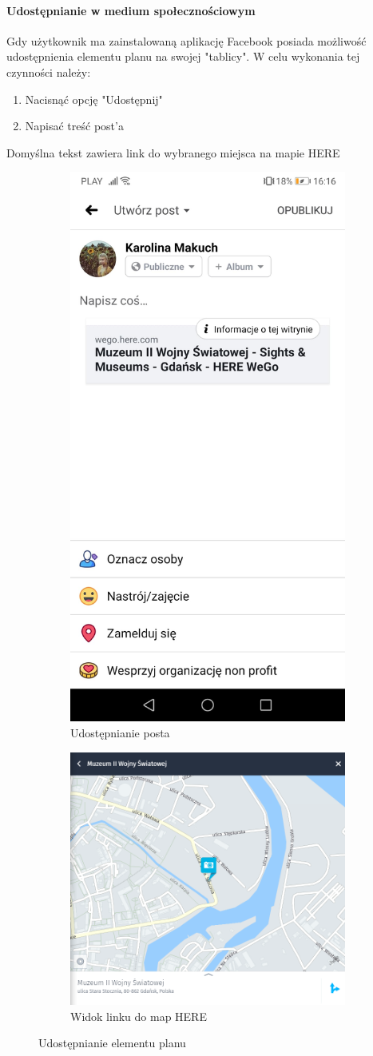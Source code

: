 \documentclass[10pt,twoside,a4paper]{report}
\begin{document}
\paragraph{Udostępnianie w medium społecznościowym}
Gdy użytkownik ma zainstalowaną aplikację Facebook posiada możliwość udostępnienia elementu planu na swojej "tablicy". W celu wykonania tej czynności należy:
\begin{enumerate}
\item Nacisnąć opcję "Udostępnij"
\item Napisać treść post'a
\end{enumerate} 
Domyślna tekst zawiera link do wybranego miejsca na mapie HERE 

\begin{figure}[h]
\begin{subfigure}{0.3\textwidth}
\centering
\includegraphics[width=0.9\linewidth, width=5cm]{shareOnFacebook}
\caption{Udostępnianie posta}
\label{fig:shareOnFacebook}
\end{subfigure}
\begin{subfigure}{0.7\textwidth}
\centering
\includegraphics[width=0.9\linewidth, width=9cm]{hereMobile}
\caption{Widok linku do map HERE}
\label{fig:hereMobile}
\end{subfigure}
\caption{Udostępnianie elementu planu}
\label{fig:podrecznik8}
\end{figure}
\end{document}
